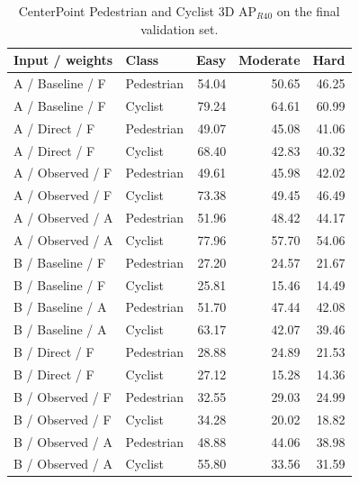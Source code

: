 \begin{table}[!t]\centering
\begin{tabular}{llrrr}\toprule
Input / weights & Class & Easy & Moderate & Hard\\\midrule
A / Baseline / F & Pedestrian & 54.04 & 50.65 & 46.25 \\
A / Baseline / F & Cyclist & 79.24 & 64.61 & 60.99 \\
A / Direct / F & Pedestrian & 49.07 & 45.08 & 41.06 \\
A / Direct / F & Cyclist & 68.40 & 42.83 & 40.32 \\
A / Observed / F & Pedestrian & 49.61 & 45.98 & 42.02 \\
A / Observed / F & Cyclist & 73.38 & 49.45 & 46.49 \\
A / Observed / A & Pedestrian & 51.96 & 48.42 & 44.17 \\
A / Observed / A & Cyclist & 77.96 & 57.70 & 54.06 \\
B / Baseline / F & Pedestrian & 27.20 & 24.57 & 21.67 \\
B / Baseline / F & Cyclist & 25.81 & 15.46 & 14.49 \\
B / Baseline / A & Pedestrian & 51.70 & 47.44 & 42.08 \\
B / Baseline / A & Cyclist & 63.17 & 42.07 & 39.46 \\
B / Direct / F & Pedestrian & 28.88 & 24.89 & 21.53 \\
B / Direct / F & Cyclist & 27.12 & 15.28 & 14.36 \\
B / Observed / F & Pedestrian & 32.55 & 29.03 & 24.99 \\
B / Observed / F & Cyclist & 34.28 & 20.02 & 18.82 \\
B / Observed / A & Pedestrian & 48.88 & 44.06 & 38.98 \\
B / Observed / A & Cyclist & 55.80 & 33.56 & 31.59 \\
\bottomrule\end{tabular}
\caption{CenterPoint Pedestrian and Cyclist 3D AP$_{R40}$ on the final validation set.}\label{tab:cp-noncar-full}
\end{table}

